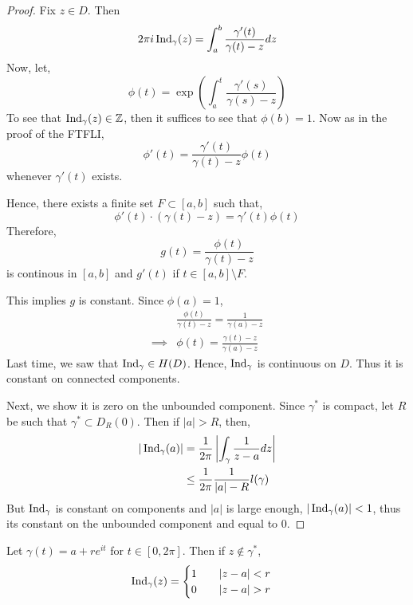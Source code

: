 \documentclass[12pt]{amsart}
\begin{document}
\begin{proof}
    Fix $z \in D$. Then 
    \[ 2\pi i \operatorname{Ind}_\gamma(z) = \int_a^b \frac{\gamma'(t)}{\gamma(t)-z} dz \] 
    Now, let, 
    \[  \phi(t) = \exp\left(\int_a^t \frac{\gamma'(s)}{\gamma(s)-z}\right)\]
    To see that $\operatorname{Ind}_\gamma(z) \in \mathbb Z$, then it suffices to see that $\phi(b) = 1$. Now as in the proof of the FTFLI, 
    \[ \phi'(t) = \frac{\gamma'(t)}{\gamma(t)-z}\phi(t) \]
    whenever $\gamma'(t)$ exists. 

    Hence, there exists a finite set $F \subset [a,b]$ such that, 
    \[ \phi'(t) \cdot (\gamma(t)-z) = \gamma'(t)\phi(t)\]
    Therefore, 
    \[ g(t) = \frac{\phi(t)}{\gamma(t)-z} \]
    is continous in $[a,b]$ and $g'(t)$ if $t \in [a,b] \setminus F$. 

    This implies $g$ is constant. Since $\phi(a) = 1$, 
    \begin{align*}
        &\frac{\phi(t)}{\gamma(t)-z} = \frac{1}{\gamma(a)-z} \\
        \implies &\phi(t) = \frac{\gamma(t)-z}{\gamma(a)-z}
    \end{align*}
    Last time, we saw that $\operatorname{Ind}_\gamma \in H(D)$. Hence, $\operatorname{Ind}_\gamma$ is continuous on $D$. Thus it is constant on connected components.

    Next, we show it is zero on the unbounded component. Since $\gamma^*$ is compact, let $R$ be such that $\gamma^* \subset D_R(0)$. Then if $|a| > R$, then, 
    \begin{align*}
        |\operatorname{Ind}_\gamma(a)| &= \frac{1}{2\pi} \left|\int_\gamma \frac{1}{z-a} dz\right| \\
        &\leq \frac{1}{2\pi} \frac{1}{|a|-R} l(\gamma)
    \end{align*}
    But $\operatorname{Ind}_\gamma$ is constant on components and $|a|$ is large enough, $|\operatorname{Ind}_\gamma(a)| < 1$, thus its constant on the unbounded component and equal to $0$.
\end{proof}

\begin{lemma}
    Let $\gamma(t) = a + re^{it}$ for $t \in [0, 2\pi]$. Then if $z \not \in \gamma^*$, 
    \begin{align*}
        \operatorname{Ind}_\gamma(z) = \begin{cases}
            1 \qquad |z-a| < r \\
            0 \qquad |z-a| > r
        \end{cases}
    \end{align*}
\end{lemma}
\end{document}
